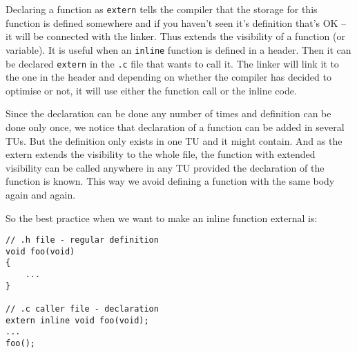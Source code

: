 Declaring a function as \texttt{extern} tells the compiler that the storage for this function is defined somewhere and if you haven't seen it's definition that's OK -- it will be connected with the linker. Thus extends the visibility of a function (or variable). It is useful when an \texttt{inline} function is defined in a header. Then it can be declared  \texttt{extern} in the \texttt{.c} file that wants to call it. The linker will link it to the one in the header and depending on whether the compiler has decided to optimise or not, it will use either the function call or the inline code. 

Since the declaration can be done any number of times and definition can be done only once, we notice that declaration of a function can be added in several TUs. But the definition only exists in one TU and it might contain. And as the extern extends the visibility to the whole file, the function with extended visibility can be called anywhere in any TU provided the declaration of the function is known. This way we avoid defining a function with the same body again and again. 
\begin{takeaway}
So the best practice when we want to make an inline function external is:
\begin{verbatim}
// .h file - regular definition
void foo(void)
{
    ...
}

// .c caller file - declaration
extern inline void foo(void);
...
foo();
\end{verbatim}
\end{takeaway}
